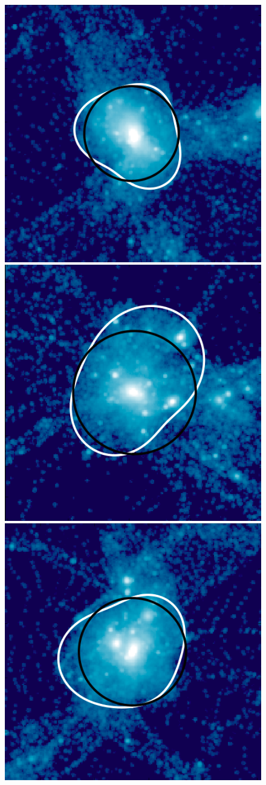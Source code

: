 \documentclass[numberedappendix,apj]{emulateapj}
\begin{document}
\begin{figure}
   \hspace{0.4cm}
   \includegraphics[width=0.7\columnwidth]{example_halos/pass_ex4.png}\\
   \vspace{0.5cm}
   \includegraphics[width=0.7\columnwidth]{example_halos/pass_ex5.png}
   \hspace{0.4cm}
   \includegraphics[width=0.7\columnwidth]{example_halos/pass_ex6.png}

\end{figure}
\end{document}
